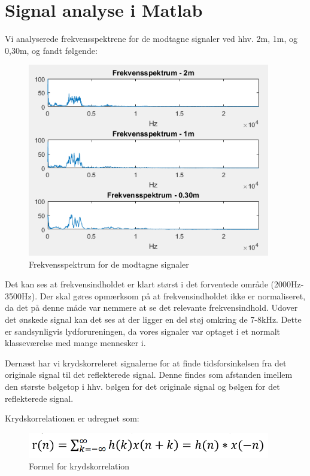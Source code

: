 \graphicspath{{Chapters/Opgave4/}}

\chapter{Signal analyse i Matlab}
Vi analyserede frekvensspektrene for de modtagne signaler ved hhv. 2m, 1m, og 0,30m, og fandt følgende:

\begin{figure}[H]
\centering
\includegraphics[width = 300pt]{Img/Frekvens.PNG}
\caption{Frekvensspektrum for de modtagne signaler}
\label{fig:Frekvensspektrum}
\end{figure}

Det kan ses at frekvensindholdet er klart størst i det forventede område (2000Hz-3500Hz). Der skal gøres opmærksom på at frekvensindholdet ikke er normaliseret, da det på denne måde var nemmere at se det relevante frekvensindhold. Udover det ønskede signal kan det ses at der ligger en del støj omkring de 7-8kHz. Dette er sandsynligvis lydforureningen, da vores signaler var optaget i et normalt klasseværelse med mange mennesker i.

Dernæst har vi krydskorreleret signalerne for at finde tidsforsinkelsen fra det originale signal til det reflekterede signal. Denne findes som afstanden imellem den største bølgetop i hhv. bølgen for det originale signal og bølgen for det reflekterede signal.

Krydskorrelationen er udregnet som:

\begin{figure}[H]
\centering
\includegraphics[width = 300pt]{Img/Krydskorrelation.PNG}
\caption{Formel for krydskorrelation}
\label{fig:Frekvensspektrum}
\end{figure}

